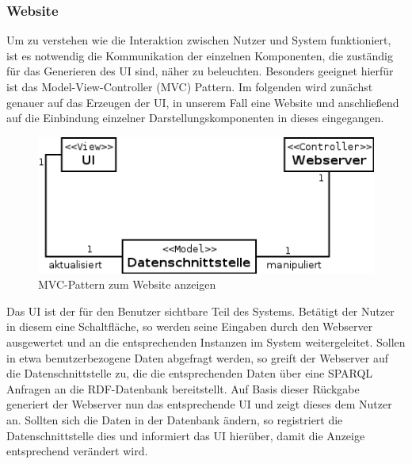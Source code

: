 

\subsubsection{Website}
\noindent Um zu verstehen wie die Interaktion zwischen Nutzer und System funktioniert, ist es notwendig die Kommunikation der einzelnen Komponenten, die zuständig für das Generieren des UI sind, näher zu beleuchten. 
Besonders geeignet hierfür ist das Model-View-Controller (MVC) Pattern. 
Im folgenden wird zunächst genauer auf das Erzeugen der UI, in unserem Fall eine Website und anschließend auf die Einbindung einzelner Darstellungskomponenten in dieses eingegangen. \\

\begin{figure}[h]
\centering
\includegraphics[width=1.0\linewidth]{Grafik/Diagramm/Pattern/MVC/Website/Kontextdiagramm.png}
\caption[MVC Website Klassen]{MVC-Pattern zum Website anzeigen}
\end{figure}

\noindent  Das UI ist der für den Benutzer sichtbare Teil des Systems. Betätigt der Nutzer in diesem eine Schaltfläche, so werden seine Eingaben durch den Webserver ausgewertet und an die entsprechenden Instanzen im System weitergeleitet. Sollen in etwa benutzerbezogene Daten abgefragt werden, so greift der Webserver auf die Datenschnittstelle zu, die die entsprechenden Daten über eine SPARQL Anfragen an die RDF-Datenbank bereitstellt. Auf Basis dieser Rückgabe generiert der Webserver nun das entsprechende UI und  zeigt dieses dem Nutzer an.
Sollten sich die Daten in der Datenbank ändern, so registriert die Datenschnittstelle dies und informiert das UI hierüber, damit die Anzeige entsprechend verändert wird.


